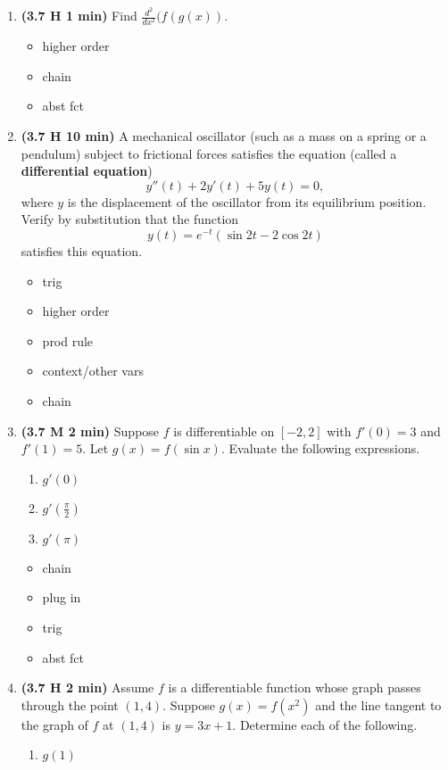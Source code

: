 \documentclass[12pt]{article}
\begin{document}
\begin{enumerate}[1.]
\item {\bf (3.7 H 1 min)} Find $\frac{d^2}{dx^2}(f(g(x))$.
{\bf\begin{itemize}
\item higher order
\item chain
\item abst fct
\end{itemize}}

\item {\bf (3.7 H 10 min)} A mechanical oscillator (such as a mass on a spring or a pendulum) subject to frictional forces satisfies the equation (called a \textbf{differential equation})
\[
y''(t)+2y'(t)+5y(t)=0,
\]
where $y$ is the displacement of the oscillator from its equilibrium position.  Verify by substitution that the function 
\[
y(t)=e^{-t}(\sin{2t}-2\cos{2t})
\]
satisfies this equation.
{\bf\begin{itemize}
\item trig
\item higher order
\item prod rule
\item context/other vars
\item chain
\end{itemize}}

\item {\bf (3.7 M 2 min)} Suppose $f$ is differentiable on $[-2,2]$ with $f'(0)=3$ and $f'(1)=5$.  Let $g(x)=f(\sin x)$.  Evaluate the following expressions.
\begin{enumerate}
	\item $g'(0)$
	
	\item $g'\left(\frac{\pi}{2}\right)$
	
	\item $g'(\pi)$
\end{enumerate}
{\bf\begin{itemize}
\item chain
\item plug in
\item trig
\item abst fct
\end{itemize}}

\item {\bf (3.7 H 2 min)} Assume $f$ is a differentiable function whose graph passes through the point $(1,4)$.  Suppose $g(x)=f(x^2)$ and the line tangent to the graph of $f$ at $(1,4)$ is $y=3x+1$.  Determine each of the following.
\begin{enumerate}
	\item $g(1)$
	

\end{enumerate}
\end{enumerate}
\end{document}
